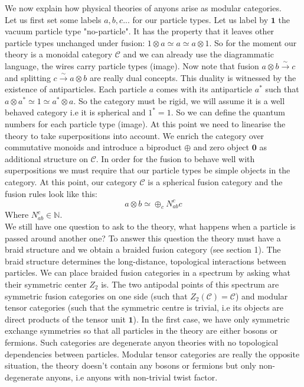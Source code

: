 \documentclass{article}
\begin{document}
We now explain how physical theories of anyons arise as modular categories. \\
Let us first set some labels $a,b,c...$ for our particle types. Let us label by $\mathbf{1}$ the vacuum particle type "no-particle". It has the property that it leaves other particle types unchanged under fusion: $1 \otimes a \simeq a \simeq a \otimes 1$. So for the moment our theory is a monoidal category $\mathcal{C}$ and we can already use the diagrammatic language, the wires carry particle types (image). Now note that fusion $a \otimes b \xrightarrow{\sim} c$ and splitting $c \xrightarrow{\sim} a \otimes b$ are really dual concepts. This duality is witnessed by the existence of antiparticles. Each particle $a$ comes with its antiparticle $a^*$ such that $a\otimes a^* \simeq 1 \simeq a^* \otimes a$. So the category must be rigid, we will assume it is a well behaved category i.e it is spherical and $1^*=1$. So we can define the quantum numbers for each particle type (image). At this point we need to linearise the theory to take superpositions into account. We enrich the category over commutative monoids and introduce a biproduct $\oplus$ and zero object $\mathbf{0}$ as additional structure on $\mathcal{C}$. In order for the fusion to behave well with superpositions we must require that our particle types be simple objects in the category. At this point, our category $\mathcal{C}$ is a spherical fusion category and the fusion rules look like this:
\begin{equation}
a\otimes b \simeq \oplus_c N_{ab}^c c
\end{equation}
Where $N_{ab}^c \in \mathbb{N}$. \\
We still have one question to ask to the theory, what happens when a particle is passed around another one? To answer this question the theory must have a braid structure and we obtain a braided fusion category (see section 1).
The braid structure determines the long-distance, topological interactions between particles. We can place braided fusion categories in a spectrum by asking what their symmetric center $Z_2$ is. The two antipodal points of this spectrum are symmetric fusion categories on one side (such that $Z_2(\mathcal{C})=\mathcal{C}$) and modular tensor categories (such that the symmetric centre is trivial, i.e its objects are direct products of the tensor unit $\mathbf{1}$). In the first case, we have only symmetric exchange symmetries so that all particles in the theory are either bosons or fermions. Such categories are degenerate anyon theories with no topological dependencies between particles. Modular tensor categories are really the opposite situation, the theory doesn't contain any bosons or fermions but only non-degenerate anyons, i.e anyons with non-trivial twist factor.
\end{document}
